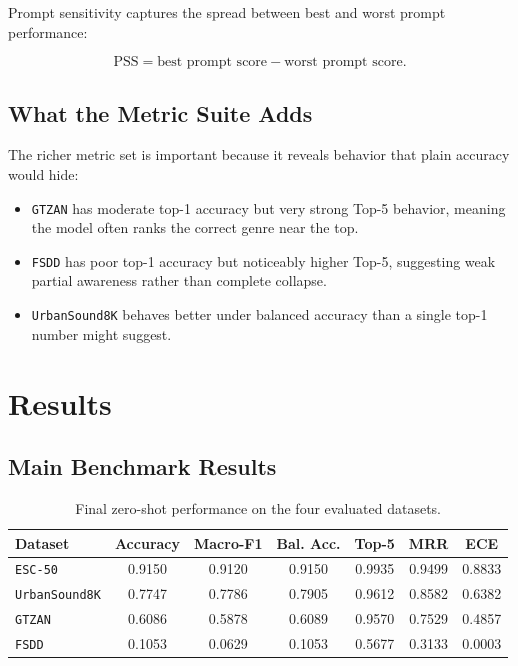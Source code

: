 \documentclass[11pt]{article}
\newcommand{\dataset}[1]{\texttt{#1}}
\begin{document}
Prompt sensitivity captures the spread between best and worst prompt
performance:

\begin{equation}
\text{PSS} = \text{best prompt score} - \text{worst prompt score}.
\end{equation}

\subsection{What the Metric Suite Adds}

The richer metric set is important because it reveals behavior that plain
accuracy would hide:
\begin{itemize}[leftmargin=1.25em]
  \item \dataset{GTZAN} has moderate top-1 accuracy but very strong Top-5
  behavior, meaning the model often ranks the correct genre near the top.
  \item \dataset{FSDD} has poor top-1 accuracy but noticeably higher Top-5,
  suggesting weak partial awareness rather than complete collapse.
  \item \dataset{UrbanSound8K} behaves better under balanced accuracy than a
  single top-1 number might suggest.
\end{itemize}

\section{Results}

\subsection{Main Benchmark Results}

\begin{table}[H]
\centering
\small
\begin{tabular}{lcccccc}
\toprule
Dataset & Accuracy & Macro-F1 & Bal. Acc. & Top-5 & MRR & ECE \\
\midrule
\dataset{ESC-50} & 0.9150 & 0.9120 & 0.9150 & 0.9935 & 0.9499 & 0.8833 \\
\dataset{UrbanSound8K} & 0.7747 & 0.7786 & 0.7905 & 0.9612 & 0.8582 & 0.6382 \\
\dataset{GTZAN} & 0.6086 & 0.5878 & 0.6089 & 0.9570 & 0.7529 & 0.4857 \\
\dataset{FSDD} & 0.1053 & 0.0629 & 0.1053 & 0.5677 & 0.3133 & 0.0003 \\
\bottomrule
\end{tabular}
\caption{Final zero-shot performance on the four evaluated datasets.}
\end{table}
\end{document}
